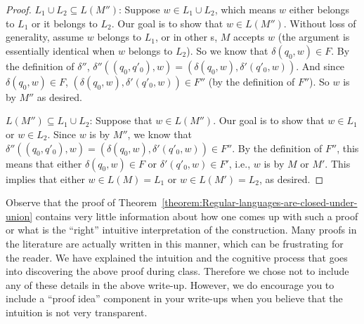 \begin{flex}
\begin{proof}
$L_1 \cup L_2 \subseteq L(M'')$: 
Suppose $w \in L_1 \cup L_2$, which means $w$ either belongs to $L_1$ or it belongs to $L_2$. Our goal is to show that $w \in L(M'')$. 
Without loss of generality, assume $w$ belongs to $L_1$, or in other s, $M$ accepts $w$ (the argument is essentially identical when $w$ belongs to $L_2$). 
So we know that $\delta(q_0, w) \in F$. 
By the definition of $\delta''$, $\delta''((q_0, q'_0), w) = (\delta(q_0,w), \delta'(q'_0, w))$. 
And since $\delta(q_0, w) \in F$, $(\delta(q_0,w), \delta'(q'_0, w)) \in F''$ (by the definition of $F''$). 
So $w$ is  by $M''$ as desired.

$L(M'') \subseteq L_1 \cup L_2$: 
Suppose that $w \in L(M'')$. 
Our goal is to show that $w \in L_1$ or  $w \in L_2$. 
Since $w$ is  by $M''$, we know that $\delta''((q_0, q'_0), w) = (\delta(q_0,w), \delta'(q'_0, w)) \in F''$. 
By the definition of $F''$, this means that either $\delta(q_0, w) \in F$ or $\delta'(q'_0, w) \in F'$, i.e., $w$ is  by $M$ or $M'$. 
This implies that either $w \in L(M) = L_1$ or $w \in L(M') = L_2$, as desired.  
\end{proof}
\end{flex}


\begin{note} \label{note:On-proof-write-up}
Observe that the proof of Theorem~\ref{theorem:Regular-languages-are-closed-under-union} contains very little information about how one comes up with such a proof or what is the ``right'' intuitive interpretation of the construction. 
Many proofs in the literature are actually written in this manner, which can be frustrating for the reader. 
We have explained the intuition and the cognitive process that goes into discovering the above proof during class. 
Therefore we chose not to include any of these details in the above write-up. 
However, we do encourage you to include a ``proof idea'' component in your write-ups when you believe that the intuition is not very transparent. 
\end{note}



